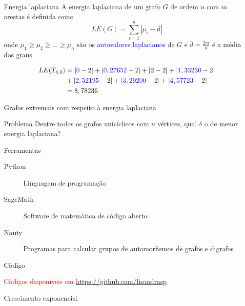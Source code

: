 \documentclass{beamer}
\begin{document}
\begin{frame}{Energia laplaciana}
    A \alert{energia laplaciana} \cite{gutman} de um grafo $G$ de ordem $n$ com $m$ arestas é definida como \[LE(G)=\sum_{i=1}^{n}|\mu_{i}-\bar{d}|\] onde $\mu_{1} \geq \mu_{2} \geq ... \geq \mu_{n}$ são os \textcolor{blue}{autovalores laplacianos} de $G$ e $\bar{d}=\frac{2m}{n}$ é a média dos graus.
    
    \begin{equation*}
        \begin{split}
            LE(T_{4,3}) & =|\textcolor{blue}{0}-2|+|\textcolor{blue}{0,27652}-2|+|\textcolor{blue}{2}-2|+|\textcolor{blue}{1,33230}-2| \\ & +|\textcolor{blue}{2,52195}-2|+|\textcolor{blue}{3,29200}-2|+|\textcolor{blue}{4,57723}-2| \\ & =8,78236
        \end{split}
    \end{equation*}
\end{frame}

\begin{frame}{Grafos extremais com respeito à energia laplaciana}
    \begin{table}[h]
        \resizebox{10cm}{!}{}
    \end{table}
\end{frame}

\begin{frame}{Problema}
Dentre todos os grafos unicíclicos com $n$ vértices, qual é o de menor energia laplaciana?
\end{frame}

\begin{frame}{Ferramentas}
\begin{description}
    \item[Python] Linguagem de programação
    \item[SageMath] Software de matemática de código aberto 
    \item[Nauty] Programas para calcular grupos de automorfismos de grafos e digrafos
\end{description}
\end{frame}

\begin{frame}[fragile]{Código}
    
    \textcolor{red}{Códigos disponíveis em \url{https://github.com/lisandrasp}}
\end{frame}

\begin{frame}{Crescimento exponencial}
    \begin{table}[h]
        
        \caption{Número de grafos e tempo de processamento.}
    \end{table}
\end{frame}
\end{document}
